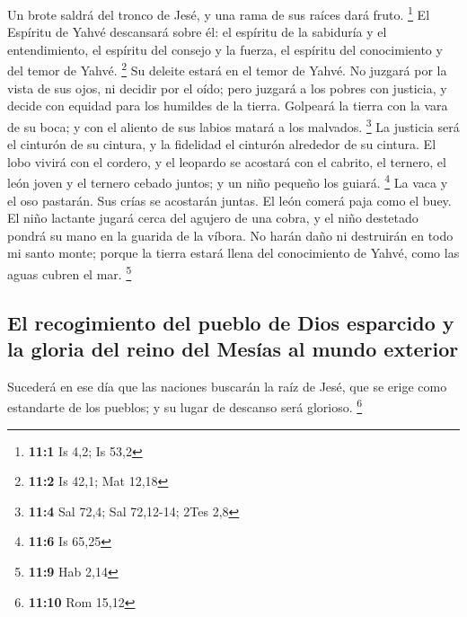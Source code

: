  Un brote saldrá del tronco de Jesé, y una rama de sus
raíces dará fruto. \footnote{\textbf{11:1} Is 4,2; Is 53,2}
 El Espíritu de Yahvé descansará sobre él: el espíritu de
la sabiduría y el entendimiento, el espíritu del consejo y la fuerza, el
espíritu del conocimiento y del temor de Yahvé. \footnote{\textbf{11:2}
  Is 42,1; Mat 12,18}  Su deleite estará en el temor de
Yahvé. No juzgará por la vista de sus ojos, ni decidir por el oído;
 pero juzgará a los pobres con justicia, y decide con
equidad para los humildes de la tierra. Golpeará la tierra con la vara
de su boca; y con el aliento de sus labios matará a los malvados.
\footnote{\textbf{11:4} Sal 72,4; Sal 72,12-14; 2Tes 2,8} 
La justicia será el cinturón de su cintura, y la fidelidad el cinturón
alrededor de su cintura.  El lobo vivirá con el cordero, y
el leopardo se acostará con el cabrito, el ternero, el león joven y el
ternero cebado juntos; y un niño pequeño los guiará. \footnote{\textbf{11:6}
  Is 65,25}  La vaca y el oso pastarán. Sus crías se
acostarán juntas. El león comerá paja como el buey.  El
niño lactante jugará cerca del agujero de una cobra, y el niño destetado
pondrá su mano en la guarida de la víbora.  No harán daño
ni destruirán en todo mi santo monte; porque la tierra estará llena del
conocimiento de Yahvé, como las aguas cubren el mar. \footnote{\textbf{11:9}
  Hab 2,14}

\hypertarget{el-recogimiento-del-pueblo-de-dios-esparcido-y-la-gloria-del-reino-del-mesuxedas-al-mundo-exterior}{%
\subsection{El recogimiento del pueblo de Dios esparcido y la gloria del
reino del Mesías al mundo
exterior}\label{el-recogimiento-del-pueblo-de-dios-esparcido-y-la-gloria-del-reino-del-mesuxedas-al-mundo-exterior}}

 Sucederá en ese día que las naciones buscarán la raíz de
Jesé, que se erige como estandarte de los pueblos; y su lugar de
descanso será glorioso. \footnote{\textbf{11:10} Rom 15,12}

